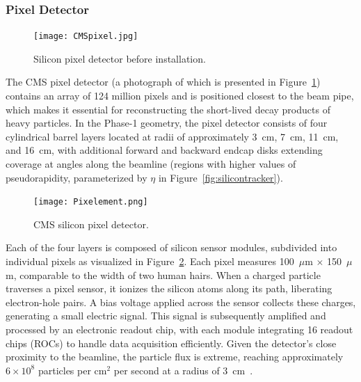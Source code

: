 \subsubsection{Pixel Detector}

\begin{figure}[!ht]
    \begin{center}
        \texttt{[image: CMSpixel.jpg]}
        \caption{Silicon pixel detector before installation.}
        \label{fig:CMSpixel}
    \end{center}
\end{figure}

The CMS pixel detector (a photograph of which is presented in Figure~\ref{fig:CMSpixel}) contains an array of 124 million pixels and is positioned closest to the beam pipe, which makes it essential for reconstructing the short-lived decay products of heavy particles. In the Phase-1 geometry, the pixel detector consists of four cylindrical barrel layers located at radii of approximately 3~cm, 7~cm, 11~cm, and 16~cm, with additional forward and backward endcap disks extending coverage at angles along the beamline (regions with higher values of pseudorapidity, parameterized by $\eta$ in Figure~\ref{fig:silicontracker}).

\begin{figure}[!ht]
    \begin{center}
        \texttt{[image: Pixelement.png]}
        \caption{CMS silicon pixel detector.}
        \label{fig:Pixelement}
    \end{center}
\end{figure}

Each of the four layers is composed of silicon sensor modules, subdivided into individual pixels as visualized in Figure~\ref{fig:Pixelement}. Each pixel measures 100~$\mu$m $\times$ 150~$\mu$m, comparable to the width of two human hairs. When a charged particle traverses a pixel sensor, it ionizes the silicon atoms along its path, liberating electron-hole pairs. A bias voltage applied across the sensor collects these charges, generating a small electric signal. This signal is subsequently amplified and processed by an electronic readout chip, with each module integrating 16 readout chips (ROCs) to handle data acquisition efficiently. Given the detector’s close proximity to the beamline, the particle flux is extreme, reaching approximately $6 \times 10^8$ particles per cm$^2$ per second at a radius of 3~cm~\cite{The_CMS_Collaboration_2008}.


